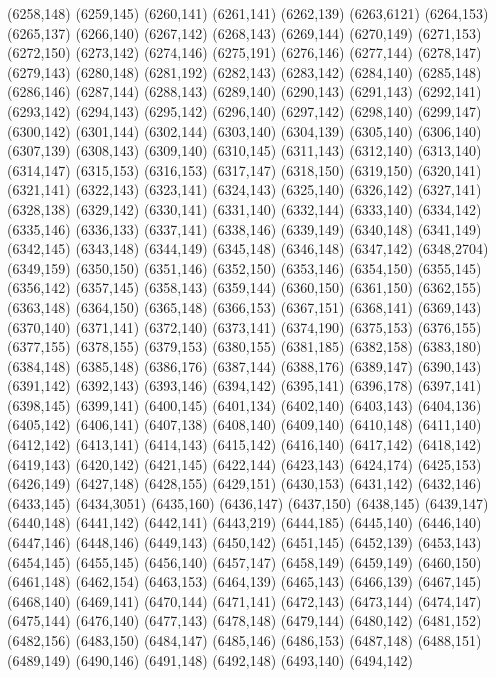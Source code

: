 (6258,148)
(6259,145)
(6260,141)
(6261,141)
(6262,139)
(6263,6121)
(6264,153)
(6265,137)
(6266,140)
(6267,142)
(6268,143)
(6269,144)
(6270,149)
(6271,153)
(6272,150)
(6273,142)
(6274,146)
(6275,191)
(6276,146)
(6277,144)
(6278,147)
(6279,143)
(6280,148)
(6281,192)
(6282,143)
(6283,142)
(6284,140)
(6285,148)
(6286,146)
(6287,144)
(6288,143)
(6289,140)
(6290,143)
(6291,143)
(6292,141)
(6293,142)
(6294,143)
(6295,142)
(6296,140)
(6297,142)
(6298,140)
(6299,147)
(6300,142)
(6301,144)
(6302,144)
(6303,140)
(6304,139)
(6305,140)
(6306,140)
(6307,139)
(6308,143)
(6309,140)
(6310,145)
(6311,143)
(6312,140)
(6313,140)
(6314,147)
(6315,153)
(6316,153)
(6317,147)
(6318,150)
(6319,150)
(6320,141)
(6321,141)
(6322,143)
(6323,141)
(6324,143)
(6325,140)
(6326,142)
(6327,141)
(6328,138)
(6329,142)
(6330,141)
(6331,140)
(6332,144)
(6333,140)
(6334,142)
(6335,146)
(6336,133)
(6337,141)
(6338,146)
(6339,149)
(6340,148)
(6341,149)
(6342,145)
(6343,148)
(6344,149)
(6345,148)
(6346,148)
(6347,142)
(6348,2704)
(6349,159)
(6350,150)
(6351,146)
(6352,150)
(6353,146)
(6354,150)
(6355,145)
(6356,142)
(6357,145)
(6358,143)
(6359,144)
(6360,150)
(6361,150)
(6362,155)
(6363,148)
(6364,150)
(6365,148)
(6366,153)
(6367,151)
(6368,141)
(6369,143)
(6370,140)
(6371,141)
(6372,140)
(6373,141)
(6374,190)
(6375,153)
(6376,155)
(6377,155)
(6378,155)
(6379,153)
(6380,155)
(6381,185)
(6382,158)
(6383,180)
(6384,148)
(6385,148)
(6386,176)
(6387,144)
(6388,176)
(6389,147)
(6390,143)
(6391,142)
(6392,143)
(6393,146)
(6394,142)
(6395,141)
(6396,178)
(6397,141)
(6398,145)
(6399,141)
(6400,145)
(6401,134)
(6402,140)
(6403,143)
(6404,136)
(6405,142)
(6406,141)
(6407,138)
(6408,140)
(6409,140)
(6410,148)
(6411,140)
(6412,142)
(6413,141)
(6414,143)
(6415,142)
(6416,140)
(6417,142)
(6418,142)
(6419,143)
(6420,142)
(6421,145)
(6422,144)
(6423,143)
(6424,174)
(6425,153)
(6426,149)
(6427,148)
(6428,155)
(6429,151)
(6430,153)
(6431,142)
(6432,146)
(6433,145)
(6434,3051)
(6435,160)
(6436,147)
(6437,150)
(6438,145)
(6439,147)
(6440,148)
(6441,142)
(6442,141)
(6443,219)
(6444,185)
(6445,140)
(6446,140)
(6447,146)
(6448,146)
(6449,143)
(6450,142)
(6451,145)
(6452,139)
(6453,143)
(6454,145)
(6455,145)
(6456,140)
(6457,147)
(6458,149)
(6459,149)
(6460,150)
(6461,148)
(6462,154)
(6463,153)
(6464,139)
(6465,143)
(6466,139)
(6467,145)
(6468,140)
(6469,141)
(6470,144)
(6471,141)
(6472,143)
(6473,144)
(6474,147)
(6475,144)
(6476,140)
(6477,143)
(6478,148)
(6479,144)
(6480,142)
(6481,152)
(6482,156)
(6483,150)
(6484,147)
(6485,146)
(6486,153)
(6487,148)
(6488,151)
(6489,149)
(6490,146)
(6491,148)
(6492,148)
(6493,140)
(6494,142)
